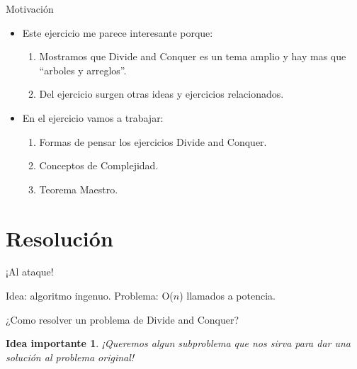 \documentclass[pdf]{beamer}
\newcommand{\quotes}[1]{``#1''}
\newtheorem{idea}{Idea importante}
\begin{document}
\begin{frame}{Motivación}
    \begin{itemize}
        \item Este ejercicio me parece interesante porque:
        \begin{enumerate}
            \vspace{1em}
            \item Mostramos que Divide and Conquer es un tema amplio y hay mas que \quotes{arboles y arreglos}.
            \vspace{1em}
            \item Del ejercicio surgen otras ideas y ejercicios relacionados.
        \end{enumerate}
        \vspace{1em}
            
        \item En el ejercicio vamos a trabajar:
        \begin{enumerate}
            \vspace{1em}
            \item Formas de pensar los ejercicios Divide and Conquer.
            \vspace{1em}
            \item Conceptos de Complejidad.
            \vspace{1em}
            \item Teorema Maestro.
        \end{enumerate}
    \end{itemize}
\end{frame}

\section{Resolución}

\begin{frame}{¡Al ataque!}
    \par{Idea: \pause algoritmo ingenuo. \pause Problema: \alert{O($n$)} llamados a potencia.}
    \pause
    \vspace{3em}
        
    ¿Como resolver un problema de Divide and Conquer?
    
    \pause
    
    \begin{idea}
	¡Queremos algun subproblema que nos sirva para dar una solución al problema original!
    \end{idea}
\end{frame}
\end{document}
